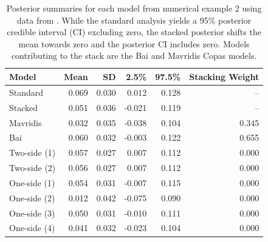 \documentclass[12pt]{article}   	%
\numberwithin{equation}{section}
\begin{document}
\begin{table}[ht]
\centering
\begin{tabular}{lrrrrr}
  \hline
Model & Mean & SD & 2.5\% & 97.5\% & Stacking Weight \\ 
  \hline
Standard & 0.069 & 0.030 & 0.012 & 0.128 & -- \\ 
  Stacked & 0.051 & 0.036 & -0.021 & 0.119 & -- \\ 
  Mavridis & 0.032 & 0.035 & -0.038 & 0.104 & 0.345 \\ 
  Bai  	& 0.060 & 0.032 & -0.003 & 0.122 & 0.655 \\ 
  Two-side (1) & 0.057 & 0.027 & 0.007 & 0.112 & 0.000 \\ 
  Two-side (2) & 0.056 & 0.027 & 0.007 & 0.112 & 0.000 \\ 
  One-side (1) & 0.054 & 0.031 & -0.007 & 0.115 & 0.000 \\ 
  One-side (2) & 0.012 & 0.042 & -0.075 & 0.090 & 0.000 \\ 
  One-side (3) & 0.050 & 0.031 & -0.010 & 0.111 & 0.000 \\ 
  One-side (4) & 0.041 & 0.032 & -0.023 & 0.104 & 0.000 \\ 
   \hline
\end{tabular}
\caption{Posterior summaries for each model from numerical example 2 using data from \citet{bornmann2007gender}. While the standard analysis yields a 95\% posterior credible interval (CI) excluding zero, the stacked posterior shifts the mean towards zero and the posterior CI includes zero. Models contributing to the stack are the Bai and Mavridis Copas models.}
\label{tab:bornmann}
\end{table}
\end{document}
